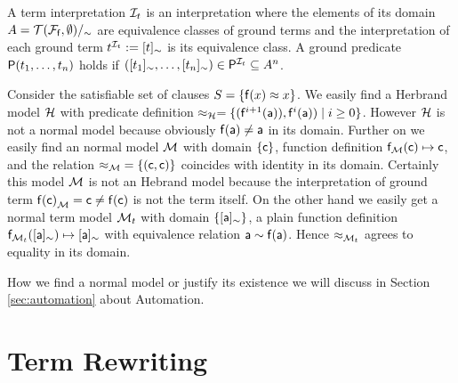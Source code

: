 \begin{definition}
	A {\myem term interpretation} 
	${\mathcal I}_t$ 
	is an interpretation 
	where the elements of its domain $A = {{\mathcal T}({\mathcal F}_{\mathsf f},\emptyset)}/_\sim$ 
	are equivalence classes of ground terms
	and the interpretation of each ground term $t^{{\mathcal I}_t} := [t]_\sim$ is its equivalence class.
	A ground predicate ${\mathsf P}(t_1,\ldots,t_n)$ holds if 
	$([t_1]_\sim,\ldots,[t_n]_\sim) \in {\mathsf P}^{{\mathcal I}_t} \subseteq A^n$.
\end{definition}


\begin{example}
	Consider the satisfiable set of clauses $S = \{ {\mathsf f}(x) \approx x \}$. 
	We easily find a Herbrand model ${\mathcal H}$ with
	predicate definition $\approx_{\mathcal H} = \{ ({\mathsf f}^{i+1}({\mathsf a})), {\mathsf f}^{i}({\mathsf a})) \mid i\geq 0  \} $. 
	However ${\mathcal H}$ is not a normal model because obviously ${\mathsf f}({\mathsf a})\neq{\mathsf a}$ in its domain.
	Further on we easily find an normal model ${\mathcal M}$ 
	with domain $\{ {\mathsf c} \}$, function definition ${\mathsf f}_{\mathcal M}({\mathsf c}) \mapsto {\mathsf c}$, 
	and the relation ${\approx_{\mathcal M}} = \{ ({\mathsf c},{\mathsf c})\}$ coincides with identity in its domain.
	Certainly this model ${\mathcal M}$ is not an Hebrand model 
	because the interpretation of ground term ${{\mathsf f}({\mathsf c})}_{\mathcal M} = {\mathsf c} \neq {\mathsf f}({\mathsf c})$ is not the term itself.
	On the other hand we easily get a normal term model ${\mathcal M}_t$ with domain $\{ [{\mathsf a}]_\sim\}$, 
	a plain function definition
	${\mathsf f}_{{\mathcal M}_t}([{\mathsf a}]_\sim) \mapsto [{\mathsf a}]_\sim$ 
	with equivalence relation
	${\mathsf a} \sim {\mathsf f}({\mathsf a})$.
	Hence $\approx_{{\mathcal M}_t}$ agrees to equality in its domain.	
\end{example}

How we find a normal model or justify its existence we will discuss in Section \vref{sec:automation} about Automation.


\section{Term Rewriting}\label{sec:termrewriting}


